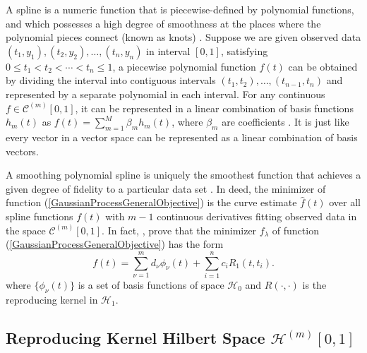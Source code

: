 A spline is a numeric function that is piecewise-defined by polynomial functions, and which possesses a high degree of smoothness at the places where the polynomial pieces connect (known as knots) \cite{judd1998numerical} \cite{chen2009feedback}. Suppose we are given observed data $(t_1,y_1),(t_2,y_2), \ldots, (t_n,y_n)$ in interval $[0,1]$, satisfying $0\leq t_1< t_2 < \cdots <t_n \leq 1$, a piecewise polynomial function $f(t)$ can be obtained by dividing the interval into contiguous intervals $(t_1,t_2),\ldots,(t_{n-1},t_n)$ and represented by a separate polynomial in each interval. For any continuous $f\in \mathcal{C}^{(m)}[0,1]$, it can be represented in a linear combination of basis functions $h_m(t)$ as $f(t) =\sum_{m=1}^{M}\beta_mh_m(t)$, where $\beta_m$ are coefficients \cite{ellis2009}. It is just like every vector in a vector space can be represented as a linear combination of basis vectors. 



A smoothing polynomial spline is uniquely the smoothest function that achieves a given degree of fidelity to a particular data set \cite{whittaker1922new}. In deed, the minimizer of function (\ref{GaussianProcessGeneralObjective}) is the curve estimate $\hat{f}(t)$ over all spline functions $f(t)$ with $m-1$ continuous derivatives fitting observed data in the space $\mathcal{C}^{(m)}[0,1]$. In fact, \cite{kimeldorf1971some},  \cite{kimeldorf1970correspondence}  prove that the minimizer $f_\lambda$ of function (\ref{GaussianProcessGeneralObjective}) has the form 
\begin{equation}
f(t)=\sum_{\nu=1}^m d_\nu \phi_\nu(t)+\sum_{i=1}^n c_iR_1(t,t_i).
\end{equation}
where $\{\phi_\nu(t)\}$ is a set of basis functions of space $\mathcal{H}_0$ and $R(\cdot,\cdot)$ is the reproducing kernel in $\mathcal{H}_1$. 



\subsection{Reproducing Kernel Hilbert Space $\mathcal{H}^{(m)}[0,1]$}


